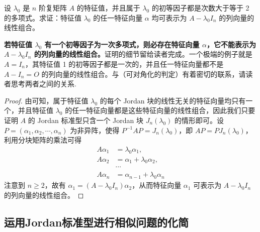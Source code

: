 \documentclass[../../main.tex]{subfiles}
\begin{document}
\begin{proposition}\label{proposition:列向量的线性组合}
设 $\lambda_0$ 是 $n$ 阶复矩阵 $A$ 的特征值，并且属于 $\lambda_0$ 的初等因子都是次数大于等于 2 的多项式。求证：特征值 $\lambda_0$ 的任一特征向量 $\alpha$ 均可表示为 $A - \lambda_0I_n$ 的列向量的线性组合。
\end{proposition}
\begin{remark}
\textbf{若特征值 $\lambda_0$ 有一个初等因子为一次多项式，则必存在特征向量 $\alpha$，它不能表示为 $A - \lambda_0I_n$ 的列向量的线性组合。}证明的细节留给读者完成。一个极端的例子就是 $A = I_n$，其特征值 1 的初等因子都是一次的，并且任一特征向量都不是 $A - I_n = O$ 的列向量的线性组合。与（可对角化的判定）有着密切的联系，请读者思考两者之间的关系.
\end{remark}
\begin{proof}
由可知，属于特征值 $\lambda_0$ 的每个 Jordan 块的线性无关的特征向量均只有一个，并且特征值 $\lambda_0$ 的任一特征向量都是这些特征向量的线性组合，因此我们只要证明 $A$ 的 Jordan 标准型只含一个 Jordan 块 $J_n(\lambda_0)$ 的情形即可。设 $P = (\alpha_1,\alpha_2,\cdots,\alpha_n)$ 为非异阵，使得 $P^{-1}AP = J_n(\lambda_0)$，即 $AP = PJ_n(\lambda_0)$，利用分块矩阵的乘法可得
\begin{align*}
A\alpha_1 &= \lambda_0\alpha_1,\\
A\alpha_2 &= \alpha_1 + \lambda_0\alpha_2,\\
&\cdots\\
A\alpha_n &= \alpha_{n - 1} + \lambda_0\alpha_n
\end{align*}
注意到 $n \geqslant  2$，故有 $\alpha_1 = (A - \lambda_0I_n)\alpha_2$，从而特征向量 $\alpha_1$ 可表示为 $A - \lambda_0I_n$ 的列向量的线性组合。
\end{proof}



\subsection{运用Jordan标准型进行相似问题的化简}
\end{document}
